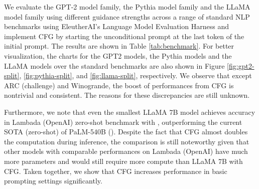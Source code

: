\documentclass{article}
\begin{document}
We evaluate the GPT-2 model family\cite{radford2019language}, the Pythia model family \cite{biderman2023pythia} and the LLaMA model family\cite{llama} using different guidance strengths across a range of standard NLP benchmarks using EleutherAI's Language
Model Evaluation Harness \cite{eval-harness} and implement CFG by starting the unconditional prompt at the last token of the initial prompt. The results are shown in Table \ref{tab:benchmark}. For better visualization, the charts for the GPT2 models, the Pythia models and the LLaMA models over the standard benchmarks are also shown in Figure \ref{fig:gpt2-split}, \ref{fig:pythia-split}, and \ref{fig:llama-split}, respectively. We observe that except ARC (challenge) and Winogrande, the boost of performances from CFG is nontrivial and consistent. The reasons for these discrepancies are still unknown.

Furthermore, we note that even the smallest LLaMA 7B model achieves  accuracy in Lambada (OpenAI) zero-shot benchmark with , outperforming the current SOTA (zero-shot) of PaLM-540B (). Despite the fact that CFG almost doubles the computation during inference, the comparison is still noteworthy given that other models with comparable performances on Lambada (OpenAI) have much more parameters and would still require more compute than LLaMA 7B with CFG. Taken together, we show that CFG increases performance in basic prompting settings significantly. 
\end{document}
